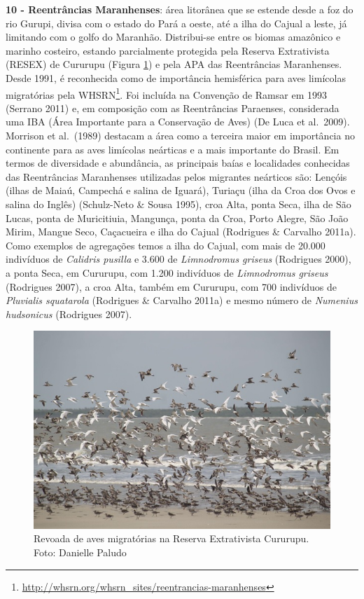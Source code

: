 \documentclass[
  oneside]{scrbook}
\DeclareRobustCommand{\href}[2]{#2\footnote{\url{#1}}}
\begin{document}
\textbf{10 - Reentrâncias Maranhenses}: área litorânea que se estende desde a foz do rio Gurupi, divisa com o estado do Pará a oeste, até a ilha do Cajual a leste, já limitando com o golfo do Maranhão. Distribui-se entre os biomas amazônico e marinho costeiro, estando parcialmente protegida pela Reserva Extrativista (RESEX) de Cururupu (Figura \ref{fig:22}) e pela APA das Reentrâncias Maranhenses. Desde 1991, é \href{http://whsrn.org/whsrn_sites/reentrancias-maranhenses}{reconhecida como de importância hemisférica para aves limícolas migratórias pela WHSRN}. Foi incluída na Convenção de Ramsar em 1993 (Serrano 2011) e, em composição com as Reentrâncias Paraenses, considerada uma IBA (Área Importante para a Conservação de Aves) (De Luca et al.~2009). Morrison et al.~(1989) destacam a área como a terceira maior em importância no continente para as aves limícolas neárticas e a mais importante do Brasil. Em termos de diversidade e abundância, as principais baías e localidades conhecidas das Reentrâncias Maranhenses utilizadas pelos migrantes neárticos são: Lençóis (ilhas de Maiaú, Campechá e salina de Iguará), Turiaçu (ilha da Croa dos Ovos e salina do Inglês) (Schulz-Neto \& Sousa 1995), croa Alta, ponta Seca, ilha de São Lucas, ponta de Muricitiuia, Mangunça, ponta da Croa, Porto Alegre, São João Mirim, Mangue Seco, Caçacueira e ilha do Cajual (Rodrigues \& Carvalho 2011a). Como exemplos de agregações temos a ilha do Cajual, com mais de 20.000 indivíduos de \emph{Calidris pusilla} e 3.600 de \emph{Limnodromus griseus} (Rodrigues 2000), a ponta Seca, em Cururupu, com 1.200 indivíduos de \emph{Limnodromus griseus} (Rodrigues 2007), a croa Alta, também em Cururupu, com 700 indivíduos de \emph{Pluvialis squatarola} (Rodrigues \& Carvalho 2011a) e mesmo número de \emph{Numenius hudsonicus} (Rodrigues 2007).

\begin{figure}[H]

{\centering \includegraphics[width=0.75\linewidth]{imagens/cap07/Figura_7.2} 

}

\caption{Revoada de aves migratórias na Reserva Extrativista Cururupu. Foto: Danielle Paludo}\label{fig:22}
\end{figure}
\end{document}
